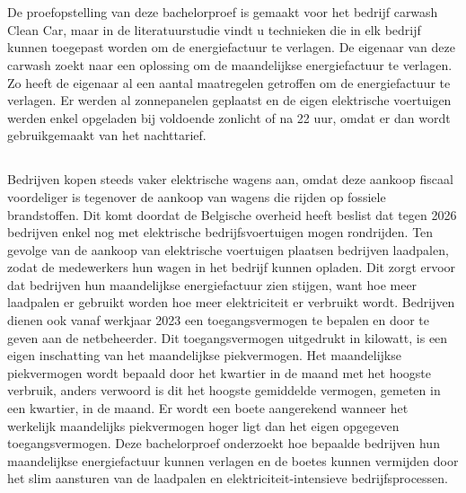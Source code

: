 
\chapter{}%
\label{ch:inleiding}

De proefopstelling van deze bachelorproef is gemaakt voor het bedrijf carwash Clean Car, maar in de literatuurstudie vindt u technieken die in elk bedrijf kunnen toegepast worden om de energiefactuur te verlagen. De eigenaar van deze carwash zoekt naar een oplossing om de maandelijkse energiefactuur te verlagen. Zo heeft de eigenaar al een aantal maatregelen getroffen om de energiefactuur te verlagen. Er werden al zonnepanelen geplaatst en de eigen elektrische voertuigen werden enkel opgeladen bij voldoende zonlicht of na 22 uur, omdat er dan wordt gebruikgemaakt van het nachttarief.

\pagebreak

\section{}%
\label{sec:probleemstelling}

Bedrijven kopen steeds vaker elektrische wagens aan, omdat deze aankoop fiscaal voordeliger is tegenover de aankoop van wagens die rijden op fossiele brandstoffen. Dit komt doordat de Belgische overheid heeft beslist dat tegen 2026 bedrijven enkel nog met elektrische bedrijfsvoertuigen mogen rondrijden. Ten gevolge van de aankoop van elektrische voertuigen plaatsen bedrijven laadpalen, zodat de medewerkers hun wagen in het bedrijf kunnen opladen. Dit zorgt ervoor dat bedrijven hun maandelijkse energiefactuur zien stijgen, want hoe meer laadpalen er gebruikt worden hoe meer elektriciteit er verbruikt wordt. Bedrijven dienen ook vanaf werkjaar 2023 een toegangsvermogen te bepalen en door te geven aan de netbeheerder. Dit toegangsvermogen uitgedrukt in kilowatt, is een eigen inschatting van het maandelijkse piekvermogen. Het maandelijkse piekvermogen wordt bepaald door het kwartier in de maand met het hoogste verbruik, anders verwoord is dit het hoogste gemiddelde vermogen, gemeten in een kwartier, in de maand. Er wordt een boete aangerekend wanneer het werkelijk maandelijks piekvermogen hoger ligt dan het eigen opgegeven toegangsvermogen. Deze bachelorproef onderzoekt hoe bepaalde bedrijven hun maandelijkse energiefactuur kunnen verlagen en de boetes kunnen vermijden door het slim aansturen van de laadpalen en elektriciteit-intensieve bedrijfsprocessen.


